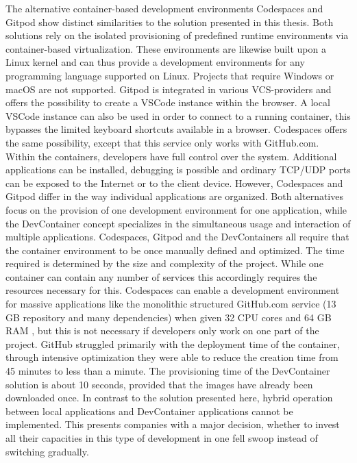         The alternative container-based development environments Codespaces and Gitpod show distinct similarities to the solution presented in this thesis. Both solutions rely on the isolated provisioning of predefined runtime environments via container-based virtualization. These environments are likewise built upon a Linux kernel and can thus provide a development environments for any programming language supported on Linux. Projects that require Windows or macOS are not supported.\newline
        Gitpod is integrated in various \ac{VCS}-providers and offers the possibility to create a \ac{VSCode} instance within the browser. A local \ac{VSCode} instance can also be used in order to connect to a running container, this bypasses the limited keyboard shortcuts available in a browser. Codespaces offers the same possibility, except that this service only works with GitHub.com. Within the containers, developers have full control over the system. Additional applications can be installed, debugging is possible and ordinary TCP/UDP ports can be exposed to the Internet or to the client device.\newline
        However, Codespaces and Gitpod differ in the way individual applications are organized. Both alternatives focus on the provision of one development environment for one application, while the DevContainer concept specializes in the simultaneous usage and interaction of multiple applications. Codespaces, Gitpod and the DevContainers all require that the container environment to be once manually defined and optimized. The time required is determined by the size and complexity of the project. While one container can contain any number of services this accordingly requires the resources necessary for this. Codespaces can enable a development environment for massive applications like the monolithic structured GitHub.com service (13 GB repository and many dependencies) when given 32 CPU cores and 64 GB RAM \cite{githubblogcodespace}, but this is not necessary if developers only work on one part of the project. GitHub struggled primarily with the deployment time of the container, through intensive optimization they were able to reduce the creation time from 45 minutes to less than a minute. The provisioning time of the DevContainer solution is about 10 seconds, provided that the images have already been downloaded once. In contrast to the solution presented here, hybrid operation between local applications and DevContainer applications cannot be implemented. This presents companies with a major decision, whether to invest all their capacities in this type of development in one fell swoop instead of switching gradually. \newline

